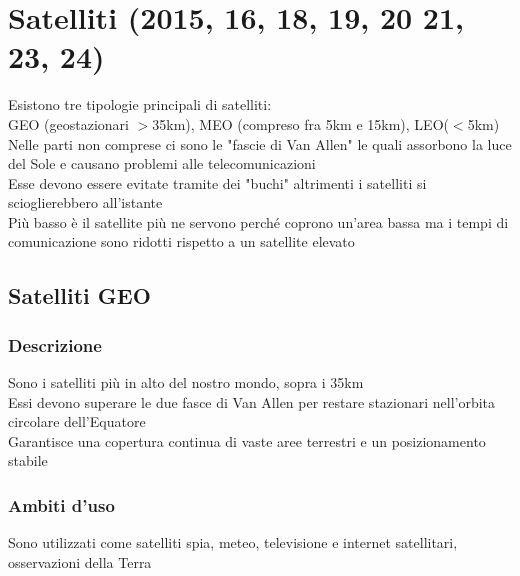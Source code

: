 \documentclass[10pt,oneside,a4paper]{article}
\begin{document}
\section{Satelliti (2015, 16, 18, 19, 20 21, 23, 24)}
Esistono tre tipologie principali di satelliti: \\
GEO (geostazionari $>$35km), MEO (compreso fra 5km e 15km), LEO($<$5km)\\
Nelle parti non comprese ci sono le "fascie di Van Allen" le quali assorbono la luce del Sole e causano problemi alle telecomunicazioni\\
Esse devono essere evitate tramite dei "buchi" altrimenti i satelliti si scioglierebbero all'istante\\
Più basso è il satellite più ne servono perché coprono un'area bassa ma i tempi di comunicazione sono ridotti rispetto a  un satellite elevato
\subsection{Satelliti GEO}
\subsubsection{Descrizione}
Sono i satelliti più in alto del nostro mondo, sopra i 35km\\
Essi devono superare le due fasce di Van Allen per restare stazionari nell'orbita circolare dell'Equatore\\
Garantisce una copertura continua di vaste aree terrestri e un posizionamento stabile
\subsubsection{Ambiti d'uso}
Sono utilizzati come satelliti spia, meteo, televisione e internet satellitari, osservazioni della Terra
\end{document}

